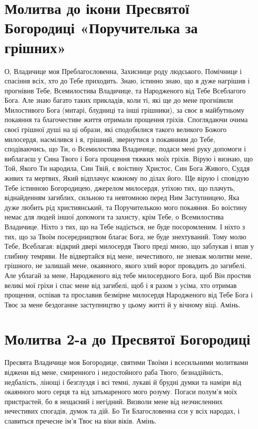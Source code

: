 \documentclass[chapters.tex]{subfiles}
\begin{document}
\section{Молитва до ікони Пресвятої Богородиці «Поручителька за грішних»}
О, Владичице моя Преблагословенна, Захиснице роду людського, Помічнице і спасіння всіх, хто до Тебе приходить. Знаю, істинно знаю, що я дуже нагрішив і прогнівив Тебе, Всемилостива Владичице, та Народженого від Тебе Всеблагого Бога. Але знаю багато таких прикладів, коли ті, які ще до мене прогнівили Милостивого Бога (митарі, блудниці та інші грішники), за своє в майбутньому покаяння та благочестиве життя отримали прощення гріхів. Споглядаючи очима своєї грішної душі на ці образи, які сподобилися такого великого Божого милосердя, насмілився і я, грішний, звернутися з покаянням до Тебе, сподіваючись, що Ти, о Всемилостива Владичице, подаси мені руку допомоги і виблагаєш у Сина Твого і Бога прощення тяжких моїх гріхів. Вірую і визнаю, що Той, Якого Ти народила, Син Твій, є воістину Христос, Син Бога Живого, Суддя живих та мертвих, Який відплачує кожному по ділах його. Ще вірую і сповідую Тебе істинною Богородицею, джерелом милосердя, утіхою тих, що плачуть, віднайденням загиблих, сильною та невтомною перед Ним Заступницею, Яка дуже любить рід християнський, та Поручителькою мого покаяння. Бо воістину немає для людей іншої допомоги та захисту, крім Тебе, о Всемилостива Владичице. Ніхто з тих, що на Тебе надіється, не буде посоромленим. І ніхто з тих, що за Твоїм посередництвом благає Бога, не буде знехтуваний. Тому молю Тебе, Всеблагая: відкрий двері милосердя Твого преді мною, що заблукав і впав у глибину темряви. Не відвертайся від мене, нечестивого, не зневаж молитви мене, грішного, не залишай мене, окаянного, якого злий ворог провадить до загибелі. Але ублагай за мене, Народженого від тебе милосердного Бога, щоб Він простив великі мої гріхи і спас мене від загибелі, щоб і я разом з усіма, хто отримав прощення, оспівав та прославив безмірне милосердя Народженого від Тебе Бога і Твоє за мене бездоганне заступництво у цьому житті й у вічному віці. Амінь.

\section{Молитва 2-а до Пресвятої Богородиці}
Пресвята Владичице моя Богородице, святими Твоїми і всесильними молитвами віджени від мене, смиренного і недостойного раба Твого, безнадійність, недбалість, лінощі і безглуздя і всі темні, лукаві й брудні думки та наміри від окаянного мого серця та від затьмареного мого розуму. Погаси полум’я моїх пристрастей, бо я нещасний і негідний. Визволи мене від незчисленних нечестивих спогадів, думок та дій. Бо Ти Благословенна єси у всіх народах, і славиться пречесне ім’я Твоє на віки віків. Амінь.
\end{document}
